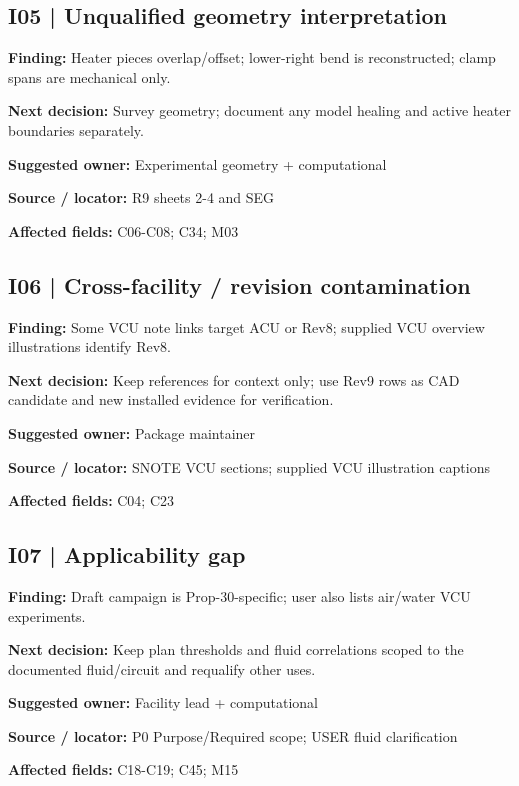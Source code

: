 \documentclass[11pt]{article}
\begin{document}
\begin{minipage}{\textwidth}\small\setlength{\parskip}{2pt}
\subsection*{I05 | Unqualified geometry interpretation}
\textbf{Finding:} Heater pieces overlap/offset; lower-right bend is reconstructed; clamp spans are mechanical only.\par
\textbf{Next decision:} Survey geometry; document any model healing and active heater boundaries separately.\par
\textbf{Suggested owner:} Experimental geometry + computational\par
\textbf{Source / locator:} R9 sheets 2-4 and SEG\par
\textbf{Affected fields:} C06-C08; C34; M03\par
\end{minipage}\par\vspace{8pt}
\begin{minipage}{\textwidth}\small\setlength{\parskip}{2pt}
\subsection*{I06 | Cross-facility / revision contamination}
\textbf{Finding:} Some VCU note links target ACU or Rev8; supplied VCU overview illustrations identify Rev8.\par
\textbf{Next decision:} Keep references for context only; use Rev9 rows as CAD candidate and new installed evidence for verification.\par
\textbf{Suggested owner:} Package maintainer\par
\textbf{Source / locator:} SNOTE VCU sections; supplied VCU illustration captions\par
\textbf{Affected fields:} C04; C23\par
\end{minipage}\par\vspace{8pt}
\begin{minipage}{\textwidth}\small\setlength{\parskip}{2pt}
\subsection*{I07 | Applicability gap}
\textbf{Finding:} Draft campaign is Prop-30-specific; user also lists air/water VCU experiments.\par
\textbf{Next decision:} Keep plan thresholds and fluid correlations scoped to the documented fluid/circuit and requalify other uses.\par
\textbf{Suggested owner:} Facility lead + computational\par
\textbf{Source / locator:} P0 Purpose/Required scope; USER fluid clarification\par
\textbf{Affected fields:} C18-C19; C45; M15\par
\end{minipage}\par\vspace{8pt}
\end{document}
